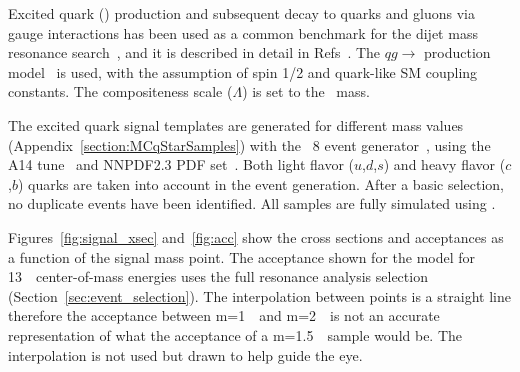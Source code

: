 
Excited quark (\qstar) production and subsequent decay to
quarks and gluons via gauge interactions has been
used as a common benchmark for the dijet mass resonance
search~\cite{EXOT-2010-01,EXOT-2010-02,EXOT-2010-07,EXOT-2011-07,EXOT-2013-11,EXOT-2016-21},
and it is described in detail in Refs~\cite{Baur:1987ga,Baur:1989kv}.
The $qg\to$ \qstar production model~\cite{Baur:1987ga,Baur:1989kv} is used,
with the assumption of spin 1/2 and quark-like SM coupling constants.
The compositeness scale ($\Lambda$) is set to the \qstar~mass.

The excited quark signal templates are generated for different mass values
(Appendix~\ref{section:MCqStarSamples}) with the \Pythia~8 event generator~\cite{pythia8},
using the A14 tune~\cite{A14tune} and NNPDF2.3 PDF set~\cite{Carrazza:2013axa}. Both light flavor ($u$,$d$,$s$) and heavy flavor ($c$,$b$) quarks are taken into account in
the event generation.
After a basic selection, no duplicate events have been identified.
All samples are fully simulated using \Geant.

Figures~\ref{fig:signal_xsec} and~\ref{fig:acc} show the cross sections and
acceptances as a function of the signal mass point.  
The acceptance shown for the \qstar model for 13~\TeV~center-of-mass energies 
uses the full resonance analysis selection (Section~\ref{sec:event_selection}).
The interpolation between points is a straight line therefore the
acceptance between m=1~\TeV~and m=2~\TeV~is not an accurate representation
of what the acceptance of a m=1.5~\TeV~sample would be.  The
interpolation is not used but drawn to help guide the eye.

